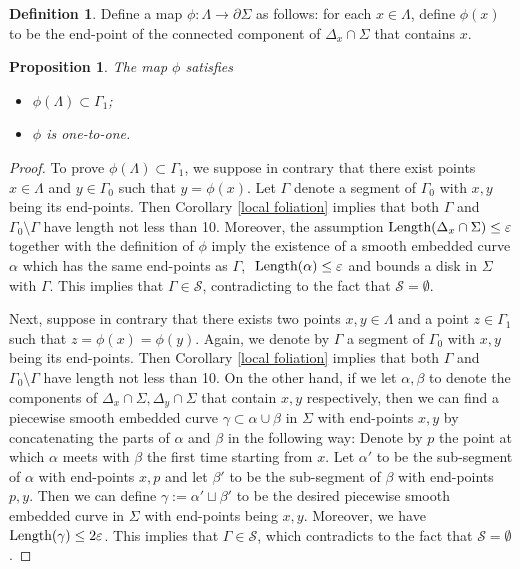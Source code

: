 \documentclass[a4paper, reqno]{amsart}
\newtheorem{proposition}[theorem]{Proposition}
\theoremstyle{definition}
\newtheorem{definition}{Definition}[section]
\theoremstyle{remark}
\numberwithin{equation}{section}
\newcommand{\Len}{\textup{Length}}
\numberwithin{equation}{section}
\numberwithin{equation}{section}
\begin{document}
\bigskip

\begin{definition} Define a map $\phi:\Lambda\to\partial\Sigma$ as follows:
for each $x\in\Lambda$, define $\phi(x)$ to be the end-point of the connected component of $\Delta_x\cap\Sigma$ that contains $x$.	
\end{definition}


\bigskip

\begin{proposition}{\label{good map}}
	The map $\phi$ satisfies
\begin{itemize}
	\item[(i)] $\phi(\Lambda)\subset \Gamma_1$;
	\item[(ii)] $\phi$ is one-to-one.
\end{itemize}
\end{proposition}

\begin{proof}
To prove $\phi(\Lambda)\subset \Gamma_1$, we suppose in contrary that there exist points $x\in \Lambda$ and $y\in \Gamma_0$ such that $y=\phi(x)$. Let $\Gamma$ denote a segment of $\Gamma_0$ with $x, y$ being its end-points. Then Corollary \ref{local foliation} implies that both $\Gamma$ and $\Gamma_0\setminus\Gamma$ have length not less than 10. Moreover, the assumption $\Len(\Delta_x\cap\Sigma)\leq\varepsilon$ together with the definition of $\phi$  imply the existence of a smooth embedded curve $\alpha$ which has the same end-points as $\Gamma$, $\ \Len(\alpha)\leq\varepsilon$ and bounds a disk in $\Sigma$ with $\Gamma$. This implies that $\Gamma\in \mathcal{S}$, contradicting to the fact that $\mathcal{S} = \emptyset$.

Next, suppose in contrary that there exists two points $x, y\in\Lambda$ and a point $z\in\Gamma_1$ such that $z = \phi(x) = \phi(y)$. Again, we denote by $\Gamma$ a segment of $\Gamma_0$ with $x, y$ being its end-points. Then Corollary \ref{local foliation} implies that both $\Gamma$ and $\Gamma_0\setminus\Gamma$ have length not less than 10. On the other hand, if we let $\alpha, \beta$ to denote the components of $\Delta_x\cap\Sigma, \Delta_y\cap\Sigma$ that contain $x, y$ respectively, then we can find a piecewise smooth embedded curve $\gamma\subset\alpha\cup\beta$ in $\Sigma$ with end-points $x, y$ by concatenating the parts of $\alpha$ and $\beta$ in the following way: Denote by $p$ the point at which $\alpha$ meets with $\beta$ the first time starting from $x$. Let $\alpha'$ to be the sub-segment of $\alpha$ with end-points $x, p$ and let $\beta'$ to be the sub-segment of $\beta$ with end-points $p, y$. Then we can define $\gamma := \alpha'\sqcup\beta'$ to be the desired piecewise smooth embedded curve in $\Sigma$ with end-points being $x, y$. Moreover, we have $\Len(\gamma)\leq 2\varepsilon$. This implies that $\Gamma\in \mathcal{S}$, which contradicts to the fact that $\mathcal{S} = \emptyset$.
\end{proof}
\end{document}
